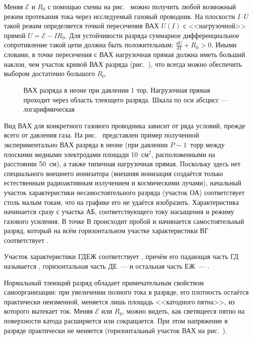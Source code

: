 Меняя $\mathcal{E}$ и $R_0$ с помощью схемы на рис.~
можно получить любой возможный режим протекания тока через исследуемый газовый проводник.
На плоскости $I$--$U$ такой режим определяется точкой пересечения ВАХ $U(I)$
с <<нагрузочной>> прямой $U=\mathcal{E}-IR_0$.
Для устойчивости разряда суммарное дифференциальное сопротивление такой цепи должна быть
положительным: $\frac{dU}{dI} + R_0 > 0$. Иными словами, в точке пересечения с ВАХ
нагрузочная прямая должна иметь больший наклон,
чем участок кривой ВАХ разряда (рис.~),
что всегда можно обеспечить выбором достаточно большого $R_0$.

\begin{figure}[h!]
    \centering
    \caption{ВАХ разряда в неоне при давлении 1 тор. Нагрузочная прямая проходит через область тлеющего разряда. Шкала по оси абсцисс --- логарифмическая}
\end{figure}

Вид ВАХ для конкретного газового проводника зависит от ряда условий, прежде
всего от давления газа. На рис.~ представлен пример
полученной экспериментально ВАХ разряда в неоне (при давлении $P\sim 1$~торр
между плоскими медными электродами площади 10~см$^2$, расположенными на
расстоянии 50~см), а также типичная нагрузочная прямая. Поскольку
здесь нет специального внешнего ионизатора (внешняя ионизация создаётся только
естественным радиоактивным излучением и космическими лучами), начальный участок
характеристики несамостоятельного разряда (участок ОА) соответствует столь
малым токам, что на графике его не удаётся изобразить. Характеристика
начинается сразу с участка АБ, соответствующего току насыщения и режиму
газового усиления. В точке В происходит пробой и начинается самостоятельный
разряд, который на всём горизонтальном участке характеристики ВГ соответствует
.

Участок характеристики ГДЕЖ соответствует ,
причём его падающая часть ГД называется ,
горизонтальная часть ДЕ~---  и
остальная часть ЕЖ~--- .

Нормальный тлеющий разряд обладает примечательным свойством самоорганизации:
при увеличении полного тока в разряде, его плотность остаётся практически
неизменной, меняется лишь площадь <<катодного пятна>>, из которого вытекает ток.
Меняя $\mathcal{E}$ или $R_0$, можно видеть, как светящееся пятно
на поверхности катода расширяется или сокращается.
При этом напряжение в разряде практически не меняется
(горизонтальный участок ВАХ на рис.~).

